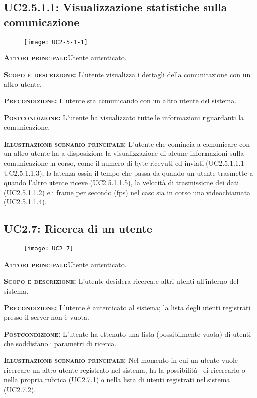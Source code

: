 \subsection{UC2.5.1.1: Visualizzazione statistiche sulla comunicazione}
\begin{figure}[H]
\begin{center}
\texttt{[image: UC2-5-1-1]}
\caption{}\label{fig:}
\end{center}
\end{figure}
\begin{description}
\item{\scshape\bfseries Attori principali:}Utente autenticato.
\item{\scshape\bfseries Scopo e descrizione:} L'utente visualizza i dettagli della comunicazione con un altro utente.
\item{\scshape\bfseries Precondizione:} L'utente sta comunicando con un altro utente del sistema.
\item{\scshape\bfseries Postcondizione:} L'utente ha visualizzato tutte le informazioni riguardanti la comunicazione.
\item{\scshape\bfseries Illustrazione scenario principale:} L'utente che comincia a comunicare con un altro utente ha a disposizione la visualizzazione di alcune informazioni sulla comunicazione in corso, come il numero di byte ricevuti ed inviati (UC2.5.1.1.1 - UC2.5.1.1.3), la latenza ossia il tempo che passa da quando un utente trasmette a quando l'altro utente riceve (UC2.5.1.1.5), la velocità di trasmissione dei dati (UC2.5.1.1.2) e i frame per secondo (fps) nel caso sia in corso una videochiamata (UC2.5.1.1.4).
\end{description}

\subsection{UC2.7: Ricerca di un utente}
\begin{figure}[H]
\begin{center}
\texttt{[image: UC2-7]}
\caption{}\label{fig:}
\end{center}
\end{figure}
\begin{description}
\item{\scshape\bfseries Attori principali:}Utente autenticato.
\item{\scshape\bfseries Scopo e descrizione:} L'utente desidera ricercare altri utenti all'interno del sistema.
\item{\scshape\bfseries Precondizione:} L'utente è autenticato al sistema; la lista degli utenti registrati presso il server non è vuota.
\item{\scshape\bfseries Postcondizione:} L'utente ha ottenuto una lista (possibilmente vuota) di utenti che soddisfano i parametri di ricerca.
\item{\scshape\bfseries Illustrazione scenario principale:} Nel momento in cui un utente vuole ricercare un altro utente registrato nel sistema, ha la possibilità  di ricercarlo o nella propria rubrica (UC2.7.1) o nella lista di utenti registrati nel sistema (UC2.7.2).
\end{description}

